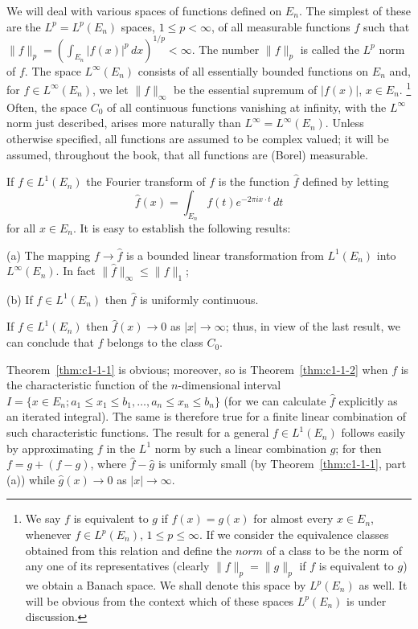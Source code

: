 We will deal with various spaces of functions defined on $E_{n}$. The simplest
of these are the $L^{p} = L^{p}(E_{n})$ spaces, $1 \leq p < \infty$, of all
measurable functions $f$ such that
$\|f\|_{p} = (\int_{E_{n}} |f(x)|^{p} \, dx)^{1/p} < \infty$. The number
$\|f\|_{p}$ is called the $L^{p}$ norm of $f$. The space $L^{\infty}(E_{n})$
consists of all essentially bounded functions on $E_{n}$ and, for
$f \in L^{\infty}(E_{n})$, we let $\|f\|_{\infty}$ be the essential supremum of
$|f(x)|$, $x \in E_{n}$.%
\footnote{We say $f$ is equivalent to $g$ if $f(x) = g(x)$ for almost every
$x \in E_{n}$, whenever $f \in L^{p}(E_{n})$, $1 \leq p \leq \infty$. If we
consider the equivalence classes obtained from this relation and define the
$norm$ of a class to be the norm of any one of its representatives (clearly
$\|f\|_{p} = \|g\|_{p}$ if $f$ is equivalent to $g$) we obtain a Banach space.
We shall denote this space by $L^{p}(E_{n})$ as well. It will be obvious from
the context which of these spaces $L^{p}(E_{n})$ is under discussion.}
Often, the space $C_{0}$ of all continuous functions vanishing at infinity,
with the $L^{\infty}$ norm just described, arises more naturally than
$L^{\infty} = L^{\infty}(E_{n})$. Unless otherwise specified, all functions are
assumed to be complex valued; it will be assumed, throughout the book, that all
functions are (Borel) measurable.

If $f \in L^{1}(E_{n})$ the Fourier transform of $f$ is the function $\hat{f}$
defined by letting
\[
\hat{f}(x)=\int_{E_{n}}f(t)e^{-2\pi i x\cdot t}\,dt
\]
for all $x \in E_{n}$. It is easy to establish the following results:

\begin{theorem}\label{thm:c1-1-1}
\textup{(a)} The mapping $f \to \hat{f}$ is a bounded linear transformation
from $L^{1}(E_{n})$ into $L^{\infty}(E_{n})$. In fact
$\|\hat{f}\|_{\infty} \leq \|f\|_{1}$;

\textup{(b)} If $f \in L^{1}(E_{n})$ then $\hat{f}$ is uniformly continuous.
\end{theorem}

\begin{theorem}\label{thm:c1-1-2}
If $f \in L^{1}(E_{n})$ then $\hat{f}(x) \to 0$ as $|x| \to \infty$; thus, in
view of the last result, we can conclude that $\hat{f}$ belongs to the class
$C_{0}$.
\end{theorem}

Theorem~\ref{thm:c1-1-1} is obvious; moreover, so is
Theorem~\ref{thm:c1-1-2} when $f$ is the characteristic function of the
$n$-dimensional interval
$I = \{x \in E_{n}; a_{1} \leq x_{1} \leq b_{1}, \ldots, a_{n} \leq x_{n} \leq b_{n}\}$
(for we can calculate $\hat{f}$ explicitly as an iterated integral). The same is
therefore true for a finite linear combination of such characteristic functions.
The result for a general $f \in L^{1}(E_{n})$ follows easily by approximating
$f$ in the $L^{1}$ norm by such a linear combination $g$; for then
$f = g + (f - g)$, where $\hat{f} - \hat{g}$ is uniformly small (by
Theorem~\ref{thm:c1-1-1}, part (a)) while $\hat{g}(x) \to 0$ as
$|x| \to \infty$.

